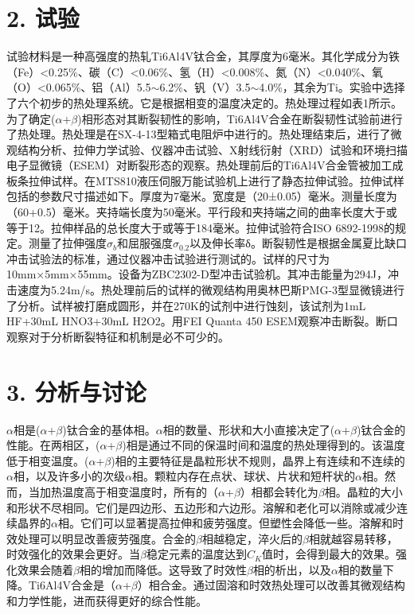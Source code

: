 \section*{2. 试验}
试验材料是一种高强度的热轧Ti6Al4V钛合金，其厚度为6毫米。其化学成分为铁（Fe）<0.25\%、碳（C）<0.06\%、氢（H）<0.008\%、氮（N）<0.040\%、氧（O）<0.065\%、铝（Al）5.5$\sim$6.2\%、钒（V）3.5$\sim$4.0\%，其余为Ti。实验中选择了六个初步的热处理系统。它是根据相变的温度决定的。热处理过程如表1所示。为了确定($\alpha$+$\beta$)相形态对其断裂韧性的影响，Ti6Al4V合金在断裂韧性试验前进行了热处理。热处理是在SX-4-13型箱式电阻炉中进行的。热处理结束后，进行了微观结构分析、拉伸力学试验、仪器冲击试验、X射线衍射（XRD）试验和环境扫描电子显微镜（ESEM）对断裂形态的观察。热处理前后的Ti6Al4V合金管被加工成板条拉伸试样。在MTS810液压伺服万能试验机上进行了静态拉伸试验。拉伸试样包括的参数尺寸描述如下。厚度为7毫米。宽度是（20±0.05）毫米。测量长度为（60+0.5）毫米。夹持端长度为50毫米。平行段和夹持端之间的曲率长度大于或等于12。拉伸样品的总长度大于或等于184毫米。拉伸试验符合ISO 6892-1998的规定。测量了拉伸强度$\sigma_b$和屈服强度$\sigma_{0.2}$以及伸长率δ。断裂韧性是根据金属夏比缺口冲击试验法的标准，通过仪器冲击试验进行测试的。试样的尺寸为10mm×5mm×55mm。设备为ZBC2302-D型冲击试验机。其冲击能量为294J，冲击速度为5.24m/s。热处理前后的试样的微观结构用奥林巴斯PMG-3型显微镜进行了分析。试样被打磨成圆形，并在270K的试剂中进行蚀刻，该试剂为1mL HF+30mL HNO3+30mL H2O2。用FEI Quanta 450 ESEM观察冲击断裂。断口观察对于分析断裂特征和机制是必不可少的。
\section*{3. 分析与讨论}
$\alpha$相是($\alpha$+$\beta$)钛合金的基体相。$\alpha$相的数量、形状和大小直接决定了($\alpha$+$\beta$)钛合金的性能。在两相区，($\alpha$+$\beta$)相是通过不同的保温时间和温度的热处理得到的。该温度低于相变温度。($\alpha$+$\beta$)相的主要特征是晶粒形状不规则，晶界上有连续和不连续的$\alpha$相，以及许多小的次级$\alpha$相。颗粒内存在点状、球状、片状和短杆状的$\alpha$相。然而，当加热温度高于相变温度时，所有的（$\alpha$+$\beta$）相都会转化为$\beta$相。晶粒的大小和形状不尽相同。它们是四边形、五边形和六边形。溶解和老化可以消除或减少连续晶界的$\alpha$相。它们可以显著提高拉伸和疲劳强度。但塑性会降低一些。溶解和时效处理可以明显改善疲劳强度。合金的$\beta$相越稳定，淬火后的$\beta$相就越容易转移，时效强化的效果会更好。当$\beta$稳定元素的温度达到$C_K$值时，会得到最大的效果。强化效果会随着$\beta$相的增加而降低。这导致了时效性$\beta$相的析出，以及$\alpha$相的数量下降。Ti6Al4V合金是（$\alpha$+$\beta$）相合金。通过固溶和时效热处理可以改善其微观结构和力学性能，进而获得更好的综合性能。

